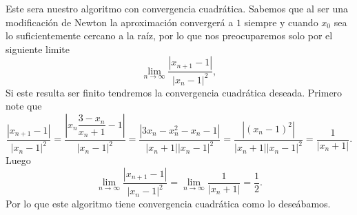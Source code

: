 \begin{itemize}
\begin{solution}
         Este sera nuestro algoritmo con convergencia cuadrática. Sabemos que al ser una modificación de Newton la aproximación convergerá a $1$ siempre y cuando $x_0$ sea lo suficientemente cercano a la raíz, por lo que nos preocuparemos solo por el siguiente limite
         $$\lim_{n\to\infty}\frac{|x_{n+1}-1|}{|x_n-1|^2},$$
         Si este resulta ser finito tendremos la convergencia cuadrática deseada. Primero note que
         $$\frac{|x_{n+1}-1|}{|x_n-1|^2}=\frac{\left|x_n\dfrac{3-x_n}{x_n+1}-1\right|}{|x_n-1|^2}=\frac{|3x_n-x_n^2-x_n-1|}{|x_n+1||x_n-1|^2}=\frac{|(x_n-1)^2|}{|x_n+1||x_n-1|^2}=\frac{1}{|x_n+1|}.$$
         Luego 
         $$\lim_{n\to\infty}\frac{|x_{n+1}-1|}{|x_n-1|^2}=\lim_{n\to \infty}\frac{1}{|x_n+1|}=\frac{1}{2}.$$
         Por lo que este algoritmo tiene convergencia cuadrática como lo deseábamos.

         \sqed
    \end{solution}
\end{itemize}
